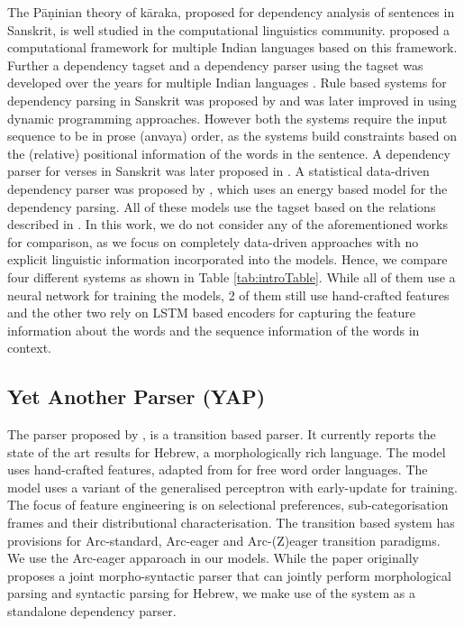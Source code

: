 \documentclass[11pt]{article}
\begin{document}
The Pāṇinian theory of k\={a}raka, proposed for dependency analysis of sentences in Sanskrit, is well studied in the computational linguistics community.  proposed a computational framework for multiple Indian languages based on this framework. Further a dependency tagset and a dependency parser using the tagset was developed over the years for multiple Indian languages \cite{tandon-sharma-2017-unity,begum-etal-2008-dependency}. Rule based systems for dependency parsing in Sanskrit was proposed by  and was later improved in  using dynamic programming approaches. However both the systems require the input sequence to be in prose (anvaya) order, as the systems build constraints based on the (relative) positional information of the words in the sentence. A dependency parser for verses in Sanskrit was later proposed in . A statistical data-driven dependency parser was proposed by , which uses an energy based model for the dependency parsing. All of these models use the tagset based on the relations described in . In this work, we do not consider any of the aforementioned works for comparison, as we focus on completely data-driven approaches with no explicit linguistic information incorporated into the models. Hence, we compare four different systems as shown in Table \ref{tab:introTable}. While all of them use a neural network for training the models, 2 of them still use hand-crafted features and the other two rely on LSTM based encoders for capturing the feature information about the words and the sequence information of the words in context.




\subsection{Yet Another Parser (YAP)}

The parser proposed by , is a transition based parser. It currently reports the state of the art results for Hebrew, a morphologically rich language. The model uses hand-crafted features, adapted from  for free word order languages. The model uses a variant of the generalised perceptron \cite{zhang-clark-2011-syntactic} with early-update \cite{collins2004incremental} for training.  The focus of feature engineering is on selectional preferences, sub-categorisation frames and their distributional characterisation.  The transition based system has provisions for Arc-standard, Arc-eager and Arc-(Z)eager transition paradigms. We use the Arc-eager apparoach in our models. While the paper originally proposes a joint morpho-syntactic parser that can jointly perform morphological parsing and syntactic parsing for Hebrew, we make use of the system as a standalone dependency parser. %
\end{document}
